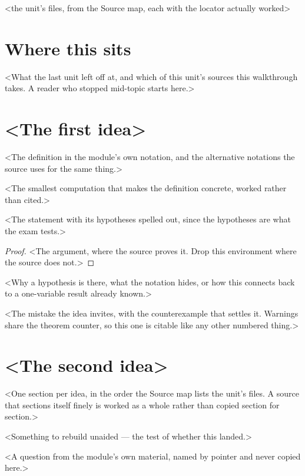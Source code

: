 \documentclass[a4paper,10pt]{article}
\begin{document}
%
  {<the unit's files, from the Source map, each with the locator actually worked>}

\section{Where this sits}
<What the last unit left off at, and which of this unit's sources this walkthrough takes. A reader
who stopped mid-topic starts here.>

\section{<The first idea>}

\begin{defn}[<term>]
<The definition in the module's own notation, and the alternative notations the source uses for
the same thing.>
\end{defn}

\begin{example}
<The smallest computation that makes the definition concrete, worked rather than cited.>
\end{example}

\begin{thm}[<name>]
<The statement with its hypotheses spelled out, since the hypotheses are what the exam tests.>
\end{thm}

\begin{proof}
<The argument, where the source proves it. Drop this environment where the source does not.>
\end{proof}

\begin{remark}
<Why a hypothesis is there, what the notation hides, or how this connects back to a one-variable
result already known.>
\end{remark}

\begin{warning}
<The mistake the idea invites, with the counterexample that settles it. Warnings share the
theorem counter, so this one is citable like any other numbered thing.>
\end{warning}

\section{<The second idea>}
<One section per idea, in the order the Source map lists the unit's files. A source that sections
itself finely is worked as a whole rather than copied section for section.>

\begin{checkyourself}
  \item <Something to rebuild unaided — the test of whether this landed.>
  \item <A question from the module's own material, named by pointer and never copied here.>
\end{checkyourself}
\end{document}
